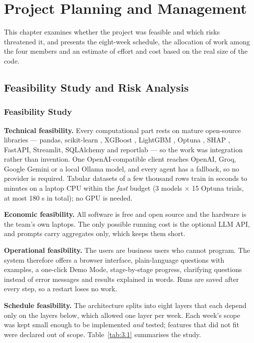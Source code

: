 \chapter{Project Planning and Management}\label{ch:3}

This chapter examines whether the project was feasible and which risks threatened it, and presents the eight-week schedule, the allocation of work among the four members and an estimate of effort and cost based on the real size of the code.

\FloatBarrier
\section{Feasibility Study and Risk Analysis}\label{sec:3.1}

\subsection{Feasibility Study}\label{sec:3.1.1}

\textbf{Technical feasibility.} Every computational part rests on mature open-source libraries --- pandas, scikit-learn \cite{ref2}, XGBoost \cite{ref3}, LightGBM \cite{ref4}, Optuna \cite{ref7}, SHAP \cite{ref10}, FastAPI, Streamlit, SQLAlchemy and reportlab --- so the work was integration rather than invention. One OpenAI-compatible client reaches OpenAI, Groq, Google Gemini or a local Ollama model, and every agent has a fallback, so no provider is required. Tabular datasets of a few thousand rows train in seconds to minutes on a laptop CPU within the \textit{fast} budget (3 models \ensuremath{\times} 15 Optuna trials, at most 180 s in total); no GPU is needed.

\textbf{Economic feasibility.} All software is free and open source and the hardware is the team's own laptops. The only possible running cost is the optional LLM API, and prompts carry aggregates only, which keeps them short.

\textbf{Operational feasibility.} The users are business users who cannot program. The system therefore offers a browser interface, plain-language questions with examples, a one-click Demo Mode, stage-by-stage progress, clarifying questions instead of error messages and results explained in words. Runs are saved after every step, so a restart loses no work.

\textbf{Schedule feasibility.} The architecture splits into eight layers that each depend only on the layers below, which allowed one layer per week. Each week's scope was kept small enough to be implemented \textit{and} tested; features that did not fit were declared out of scope. Table~\ref{tab:3.1} summarises the study.

